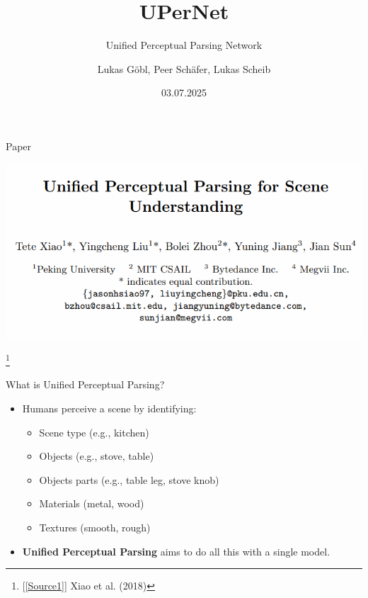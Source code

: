 \documentclass{beamer}
\title[UPerNet]{UPerNet}
\subtitle{Unified Perceptual Parsing Network}
\author[Göbl, Schäfer, Scheib]{Lukas Göbl, Peer Schäfer, Lukas Scheib}
\institute{Computer Vision Journal Club\\
University of Cologne}
\date{03.07.2025}
\newcommand\blfootnote[1]{
  \begingroup
  \renewcommand\thefootnote{}\footnote{#1}
  \addtocounter{footnote}{-1}
  \endgroup
}
\begin{document}
\begingroup
{}
\maketitle
\endgroup
\addtocounter{framenumber}{1}


\begin{frame}{Paper}
    \begin{center}
        \includegraphics[width=0.9\linewidth]{Images/paper.png}
        \blfootnote{[\ref{Source1}] Xiao et al. (2018)}
    \end{center}
\end{frame}


\begin{frame}{What is Unified Perceptual Parsing?}
    \begin{itemize}
        \item Humans perceive a scene by identifying:
        \begin{itemize}
            \item Scene type (e.g., kitchen)
            \item Objects (e.g., stove, table)
            \item Objects parts (e.g., table leg, stove knob)
            \item Materials (metal, wood)
            \item Textures (smooth, rough)
        \end{itemize}
        \item \textbf{Unified Perceptual Parsing} aims to do all this with a single model.
    \end{itemize}
    \vfill
\end{frame}
\end{document}
